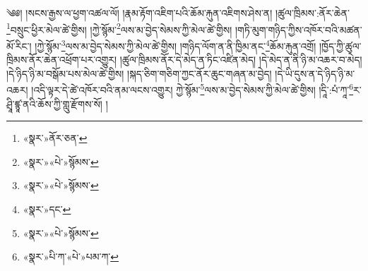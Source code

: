 ༄༅། །སངས་རྒྱས་ལ་ཕྱག་འཚལ་ལོ། །རྣམ་རྟོག་འཇིག་པའི་ཆོམ་རྐུན་འཇིགས་ཤེས་ན། །ཚུལ་ཁྲིམས་:ནོར་ཆེན་\footnote{«སྣར་»ནོར་ཅན་}བསྲུང་ཕྱིར་མེལ་ཚེ་གྱིས། །ཀྱེ་སྙོམ་\footnote{«སྣར་»«པེ་»སྙོམས་}ལས་མ་བྱེད་སེམས་ཀྱི་མེལ་ཚེ་གྱིས། །གཏི་མུག་གཉིད་ཀྱིས་འཁོར་བའི་མཚན་མོ་རིང་། །ཀྱེ་སྙོམ་\footnote{«སྣར་»«པེ་»སྙོམས་}ལས་མ་བྱེད་སེམས་ཀྱི་མེལ་ཚེ་གྱིས། །གཉིད་ལོག་ན་ནི་ཁྱིམ་ནང་\footnote{«སྣར་»དང་}ཆོམ་རྐུན་འགྲོ། །ཁྱོད་ཀྱི་ཚུལ་ཁྲིམས་ནོར་ཆེན་འཕྲོག་པར་འགྱུར། །ཚུལ་ཁྲིམས་ནོར་དེ་མེད་ན་ཏིང་འཛིན་མེད། །དེ་མེད་ན་ནི་ཉི་མ་འཆར་བ་མེད། །དེ་ཉིད་ཉི་མ་བསྒོམ་པས་མེལ་ཚེ་གྱིས། །སྐད་ཅིག་གཅིག་ཀྱང་ནོར་ཆུང་གཞན་མ་བྱེད། །དེ་ཡི་དུས་ན་དེ་ཉིད་ཉི་མ་འཆར། །འདི་ལྟར་དེ་ཚེ་འཁོར་བའི་ནམ་ལངས་འགྱུར། ཀྱེ་སྙོམ་\footnote{«སྣར་»«པེ་»སྙོམས་}ལས་མ་བྱེད་སེམས་ཀྱི་མེལ་ཚེ་གྱིས། །དཱི་:པཾ་ཀཱ་\footnote{«སྣར་»པི་ཀ་«པེ་»པམ་ཀ་}ར་ཤྲཱི་ཛྙཱ་ནའི་ཆོས་ཀྱི་གླུ་རྫོགས་སོ། ། 